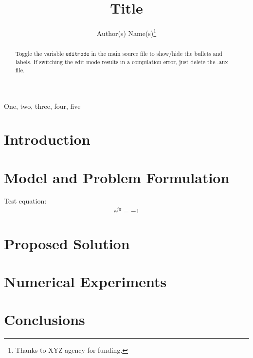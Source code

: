 \documentclass{article}
\begin{document}
\title{Title}

\if{}
\address{Author Affiliation(s)}
\else
\author{Author(s) Name(s)\thanks{Thanks to XYZ agency for funding.}}
\fi

\maketitle


\begin{abstract}
Toggle the variable \texttt{editmode} in the main source file to
show/hide the bullets and labels. If switching the edit mode results
in a compilation error, just delete the .aux file. 
\end{abstract}


\begin{keywords}
One, two, three, four, five
\end{keywords}

\section{Introduction}
\begin{bullets}
\blt[overview]
\blt[motivation]
\blt[contributions]
\blt[notation]
\end{bullets}

\section{Model and Problem Formulation}

Test equation:
\begin{align}
\label{eq:euler}
e^{j\pi}=-1
\end{align}


\section{Proposed Solution}

\section{Numerical Experiments}

\begin{bullets}
\end{bullets}


\section{Conclusions}


\printmybibliography
\end{document}
